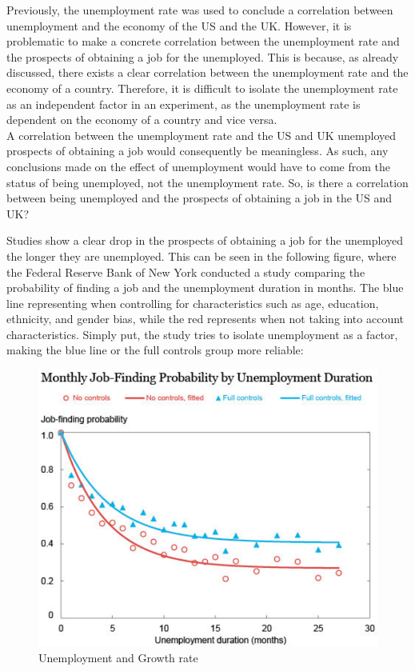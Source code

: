 Previously, the unemployment rate was used to conclude a correlation between unemployment and the economy of the US and the UK.
However, it is problematic to make a concrete correlation between the unemployment rate and the prospects of obtaining a job for the unemployed.
This is because, as already discussed, there exists a clear correlation between the unemployment rate and the economy of a country.
Therefore, it is difficult to isolate the unemployment rate as an independent factor in an experiment, as the unemployment rate is dependent on the economy of a country and vice versa. \\

A correlation between the unemployment rate and the US and UK unemployed prospects of obtaining a job would consequently be meaningless.
As such, any conclusions made on the effect of unemployment would have to come from the status of being unemployed, not the unemployment rate.
So, is there a correlation between being unemployed and the prospects of obtaining a job in the US and UK?

Studies show a clear drop in the prospects of obtaining a job for the unemployed the longer they are unemployed.
This can be seen in the following figure, where the Federal Reserve Bank of New York conducted a study comparing the probability of finding a job and the unemployment duration in months.
The blue line representing when controlling for characteristics such as age, education, ethnicity, and gender bias, while the red represents when not taking into account characteristics.
Simply put, the study tries to isolate unemployment as a factor, making the blue line or the full controls group more reliable: \\

\begin{figure}[H]
   \centering
   \includegraphics[scale = 0.5]{figures/Unemployment_Time}
   \caption{Unemployment and Growth rate \cite{Unemployment_effect_unemployed}}
   \label{fig:Unemployment Time}
 \end{figure}


